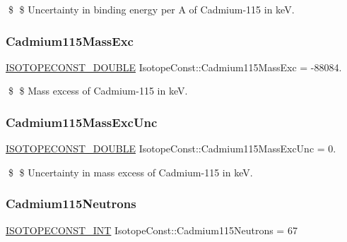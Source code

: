 \$ \$ Uncertainty in binding energy per A of Cadmium-\/115 in keV. \mbox{\label{group___isotope_const-_cadmium-_cd115_ga2ca65c94592af7f01c6820157f8c58d2}} 
\subsubsection{\texorpdfstring{Cadmium115\+Mass\+Exc}{Cadmium115MassExc}}
{\footnotesize\ttfamily \mbox{\hyperlink{group___isotope_const-_macros_ga8f45a7272ce02c0b4c65c44636ed719a}{I\+S\+O\+T\+O\+P\+E\+C\+O\+N\+S\+T\+\_\+\+D\+O\+U\+B\+LE}} Isotope\+Const\+::\+Cadmium115\+Mass\+Exc = -\/88084.}

\$ \$ Mass excess of Cadmium-\/115 in keV. \mbox{\label{group___isotope_const-_cadmium-_cd115_ga6dbf190ca93d77c295d1d4d21fdb13fe}} 
\subsubsection{\texorpdfstring{Cadmium115\+Mass\+Exc\+Unc}{Cadmium115MassExcUnc}}
{\footnotesize\ttfamily \mbox{\hyperlink{group___isotope_const-_macros_ga8f45a7272ce02c0b4c65c44636ed719a}{I\+S\+O\+T\+O\+P\+E\+C\+O\+N\+S\+T\+\_\+\+D\+O\+U\+B\+LE}} Isotope\+Const\+::\+Cadmium115\+Mass\+Exc\+Unc = 0.}

\$ \$ Uncertainty in mass excess of Cadmium-\/115 in keV. \mbox{\label{group___isotope_const-_cadmium-_cd115_ga66c8103fc14bb925377c67dae4e96a62}} 
\subsubsection{\texorpdfstring{Cadmium115\+Neutrons}{Cadmium115Neutrons}}
{\footnotesize\ttfamily \mbox{\hyperlink{group___isotope_const-_macros_ga5f18360b3e99483a35c32d789e62621c}{I\+S\+O\+T\+O\+P\+E\+C\+O\+N\+S\+T\+\_\+\+I\+NT}} Isotope\+Const\+::\+Cadmium115\+Neutrons = 67}

